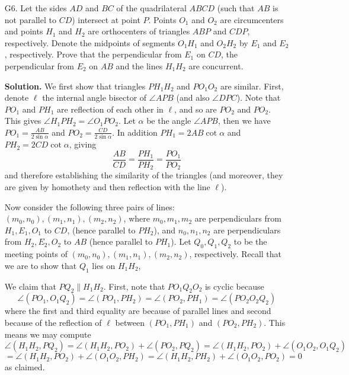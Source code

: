 \documentclass[11pt,a4paper]{article}
\begin{document}
\begin{enumerate}
    	\item [G6.]
    	Let the sides $AD$ and $BC$ of the quadrilateral $ABCD$ (such that $AB$ is not parallel to $CD$) intersect at point $P$. Points $O_1$ and $O_2$ are circumcenters and points $H_1$ and $H_2$ are orthocenters of triangles $ABP$ and $CDP$, respectively. Denote the midpoints of segments $O_1H_1$ and $O_2H_2$ by $E_1$ and $E_2$, respectively. Prove that the perpendicular from $E_1$ on $CD$, the perpendicular from $E_2$ on $AB$ and the lines $H_1H_2$ are concurrent.
    	
    	\textbf{Solution.} 
    	We first show that triangles $PH_1H_2$ and $PO_1O_2$ are similar. 
    	First, denote $\ell$ the internal angle bisector of $\angle APB$ (and also $\angle DPC$). 
    	Note that $PO_1$ and $PH_1$ are reflection of each other in $\ell$, 
    	and so are $PO_2$ and $PO_2$. 
    	This gives $\angle H_1PH_2 = \angle O_1PO_2$. 
    	Let $\alpha$ be the angle $\angle APB$, then we have $PO_1 = \frac{AB}{2\sin \alpha}$ and $PO_2 = \frac{CD}{2\sin\alpha}$. 
    	In addition $PH_1 = 2AB\cot\alpha$ and $PH_2 = 2CD\cot\alpha$, giving 
    	\[
    	\frac{AB}{CD} = \frac{PH_1}{PH_2} = \frac{PO_1}{PO_2}
    	\]
    	and therefore establishing the similarity of the triangles (and moreover, they are given by homothety and then reflection with the line $\ell$). 
    	
    	Now consider the following three pairs of lines: $(m_0, n_0), (m_1, n_1), (m_2, n_2)$, 
    	where $m_0, m_1, m_2$ are perpendiculars from $H_1, E_1, O_1$ to $CD$, 
    	(hence parallel to $PH_2$), 
    	and $n_0, n_1, n_2$ are perpendiculars from $H_2, E_2, O_2$ to $AB$ (hence parallel to $PH_1$). 
    	Let $Q_0, Q_1, Q_2$ to be the meeting points of $(m_0, n_0), (m_1, n_1), (m_2, n_2)$, respectively. 
    	Recall that we are to show that $Q_1$ lies on $H_1H_2$, 
    	
    	We claim that $PQ_2\parallel H_1H_2$. First, note that $PO_1Q_2O_2$ is cyclic because 
    	\[
    	\angle (PO_1, O_1Q_2) = \angle (PO_1, PH_2)
    	=\angle (PO_2, PH_1) = \angle(PO_2 O_2Q_2)
    	\]
    	where the first and third equality are because of parallel lines and second because of the reflection of $\ell$ between $(PO_1, PH_1)$ and $(PO_2, PH_2)$. 
    	This means we may compute 
    	\[
    	\angle (H_1H_2, PQ_2)
    	=\angle (H_1H_2, PO_2) + \angle (PO_2, PQ_2)
    	=\angle (H_1H_2, PO_2) + \angle (O_1O_2, O_1Q_2)
    	\]\[
    	=\angle (H_1H_2, PO_2) + \angle (O_1O_2, PH_2)
    	=\angle (H_1H_2, PH_2) + \angle (O_1O_2, PO_2)
    	=0
    	\]
    	as claimed. 
    	

\end{enumerate}
\end{document}
